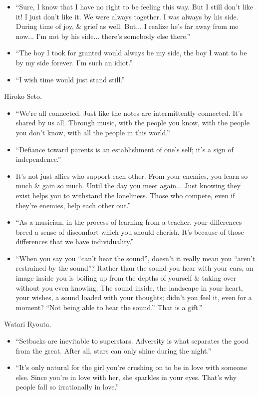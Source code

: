 \documentclass{article}
\begin{document}
\begin{enumerate}
\begin{itemize}
    	\item ``Sure, I know that I have no right to be feeling this way. But I still don't like it! I just don't like it. We were always together. I was always by his side. During time of joy, \& grief as well. But... I realize he's far away from me now... I'm not by his side... there's somebody else there.''
    	\item ``The boy I took for granted would always be my side, the boy I want to be by my side forever. I'm such an idiot.''
    	\item ``I wish time would just stand still.''
    \end{itemize}
    {\sc Hiroko Seto.}
    \begin{itemize}
    	\item ``We're all connected. Just like the notes are intermittently connected. It's shared by us all. Through music, with the people you know, with the people you don't know, with all the people in this world.''
    	\item ``Defiance toward parents is an establishment of one's self; it's a sign of independence.''
    	\item It's not just allies who support each other. From your enemies, you learn so much \& gain so much. Until the day you meet again... Just knowing they exist helps you to withstand the loneliness. Those who compete, even if they're enemies, help each other out.''
    	\item ``As a musician, in the process of learning from a teacher, your differences breed a sense of discomfort which you should cherish. It's because of those differences that we have individuality.''
    	\item ``When you say you ``can't hear the sound'', doesn't it really mean you ``aren't restrained by the sound''? Rather than the sound you hear with your ears, an image inside you is boiling up from the depths of yourself \& taking over without you even knowing. The sound inside, the landscape in your heart, your wishes, a sound loaded with your thoughts; didn't you feel it, even for a moment? ``Not being able to hear the sound.'' That is a gift.''
    \end{itemize}
    {\sc Watari Ryouta.}
    \begin{itemize}
    	\item ``Setbacks are inevitable to superstars. Adversity is what separates the good from the great. After all, stars can only shine during the night.''
    	\item ``It's only natural for the girl you're crushing on to be in love with someone else. Since you're in love with her, she sparkles in your eyes. That's why people fall so irrationally in love.''

\end{itemize}
\end{enumerate}
\end{document}
